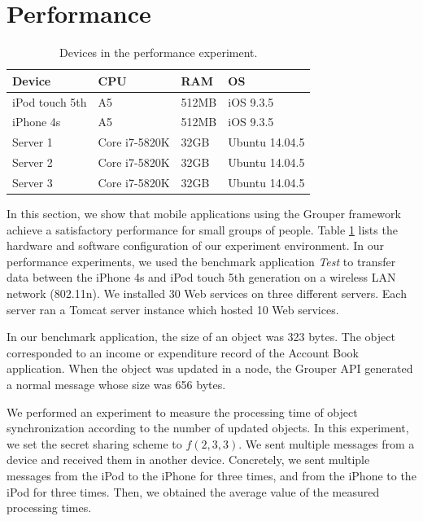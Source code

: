 \documentclass[a4paper,11pt]{report}
\begin{document}
\section{Performance} \label{section:performance}

\begin{table}[t]
	\centering
	\caption{Devices in the performance experiment.}
	\label{table:experiment_devices}
	\begin{tabular}{llll}
		\toprule
		\textbf{Device} & \textbf{CPU} & \textbf{RAM} & \textbf{OS} \\ 
		\midrule
		iPod touch 5th & A5 & 512MB & iOS 9.3.5 \\
		iPhone 4s & A5 & 512MB & iOS 9.3.5 \\
		Server 1 & Core i7-5820K & 32GB & Ubuntu 14.04.5 \\
		Server 2 & Core i7-5820K & 32GB & Ubuntu 14.04.5 \\
		Server 3 & Core i7-5820K & 32GB & Ubuntu 14.04.5 \\ 
		\bottomrule
	\end{tabular}
\end{table}

In this section, we show that mobile applications using the Grouper framework achieve a satisfactory performance for small groups of people.
Table \ref{table:experiment_devices} lists the hardware and software configuration of our experiment environment.
In our performance experiments, we used the benchmark application \emph{Test} to transfer data between the iPhone 4s and iPod touch 5th generation on a wireless LAN network (802.11n).
We installed 30 Web services on three different servers.
Each server ran a Tomcat server instance which hosted 10 Web services.

In our benchmark application, the size of an object was 323 bytes.
The object corresponded to an income or expenditure record of the Account Book application.
When the object was updated in a node, the Grouper API generated a normal message whose size was 656 bytes.

We performed an experiment to measure the processing time of object synchronization according to the number of updated objects.
In this experiment, we set the secret sharing scheme to ${f(2, 3, 3)}$.
We sent multiple messages from a device and received them in another device. 
Concretely, we sent multiple messages from the iPod to the iPhone for three times, and from the iPhone to the iPod for three times.
Then, we obtained the average value of the measured processing times.
\end{document}

